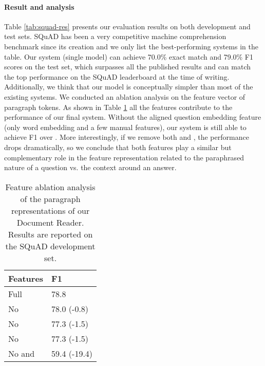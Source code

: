 \documentclass[11pt,a4paper]{article}
\newcommand{\finalem}{70.0}
\newcommand{\finalf}{79.0}
\begin{document}
\paragraph{Result and analysis} Table \ref{tab:squad-res} presents our evaluation results on both development and test sets. SQuAD has been a very competitive machine comprehension benchmark since its creation and we only list the best-performing systems in the table. Our system (single model) can achieve {\finalem}\% exact match and {\finalf}\% F1 scores on the test set, which surpasses all the published results and can match the top performance on the SQuAD leaderboard at the time of writing. Additionally, we think that our model is conceptually simpler than most of the existing systems. We conducted an ablation analysis on the feature vector of paragraph tokens. As shown in Table \ref{tab:feature-ablation} all the features contribute to the performance of our final system. Without the aligned question embedding feature (only word embedding and a few manual features), our system is still able to achieve F1 over . More interestingly, if we remove both  and , the performance drops dramatically, so we conclude that both features play a similar but complementary role in the feature representation related to the paraphrased nature of a question vs. the context around an answer.

\begin{table}
	\begin{center}
	\begin{tabular}{l | l}
    \hline
    \bf Features & \bf F1\\
    \hline
    Full & 78.8 \\
    \hline
    No  & 78.0 (-0.8)\\
    No  & 77.3 (-1.5)\\
    No  & 77.3 (-1.5)\\
    No  and  & 59.4 (-19.4) \\
    \hline
    \end{tabular}
    \end{center}
    \caption{\label{tab:feature-ablation}Feature ablation analysis of the paragraph representations of our Document Reader. Results are reported on the SQuAD development set.}
\end{table}
\end{document}
